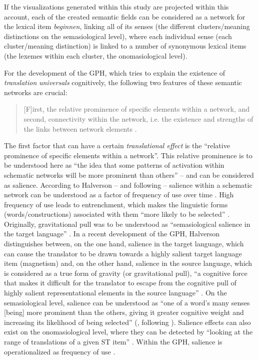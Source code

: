 If the visualizations generated within this study are projected within this account, each of the created semantic fields can be considered as a network for the lexical item \textit{beginnen}, linking all of its senses (the different clusters\slash meaning distinctions on the semasiological level), where each individual sense (each cluster\slash meaning distinction) is linked to a number of synonymous lexical items (the lexemes within each cluster, the onomasiological level).

For the development of the GPH, which tries to explain the existence of \textit{translation} \textit{universals} cognitively, the following two features of these semantic networks are crucial:

\begin{quote}
[F]irst, the relative prominence of specific elements within a network, and second, connectivity within the network, i.e. the existence and strengths of the links between network elements \citep[12]{de_sutter_developing_2017}.
\end{quote}

The first factor that can have a certain \textit{translational effect} is the “relative prominence of specific elements within a network”. This relative prominence is to be understood here as “the idea that some patterns of activation within schematic networks will be more prominent than others” \citep[13]{de_sutter_developing_2017} – and can be considered as salience. According to Halverson – and following \citet[226]{langacker_cognitive_2008} – salience within a schematic network can be understood as a factor of frequency of use over time \citep[13]{de_sutter_developing_2017}. High frequency of use leads to entrenchment, which makes the linguistic forms (words\slash constructions) associated with them “more likely to be selected” \citep[13]{de_sutter_developing_2017}. Originally, gravitational pull \citep{halverson_cognitive_2003} was to be understood as “semasiological salience in the target language” \citep[14]{de_sutter_developing_2017}. In a recent development of the GPH, Halverson distinguishes between, on the one hand, salience in the target language, which can cause the translator to be drawn towards a highly salient target language item (magnetism) and, on the other hand, salience in the source language, which is considered as a true form of gravity (or gravitational pull), “a cognitive force that makes it difficult for the translator to escape from the cognitive pull of highly salient representational elements in the source language” \citep[14]{de_sutter_developing_2017}. On the semasiological level, salience can be understood as “one of a word’s many senses [being] more prominent than the others, giving it greater cognitive weight and increasing its likelihood of being selected” (\citealt[13]{de_sutter_developing_2017}, following \citealt[80]{geeraerts_words_2009}). Salience effects can also exist on the onomasiological level, where they can be detected by “looking at the range of translations of a given ST item” \citep[28]{de_sutter_developing_2017}. Within the GPH, salience is operationalized as frequency of use \citep[13]{de_sutter_developing_2017}.

